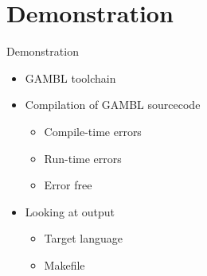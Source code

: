 \section{Demonstration} %
\label{sec:demonstration}
\begin{frame}{Demonstration}
    \begin{itemize}
        \item GAMBL toolchain
        \item Compilation of GAMBL sourcecode
        \begin{itemize}
            \item Compile-time errors
            \item Run-time errors
            \item Error free
        \end{itemize}
        \item Looking at output
        \begin{itemize}
            \item Target language
            \item Makefile
        \end{itemize}
    \end{itemize}
\end{frame}

